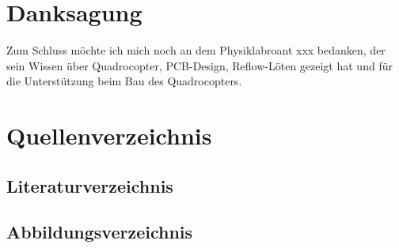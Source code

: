 \documentclass[12pt,a4paper, ngerman]{article}
\begin{document}
\section{Danksagung}
Zum Schluss möchte ich mich noch an dem Physiklabroant xxx bedanken, der sein Wissen über Quadrocopter, PCB-Design, Reflow-Löten gezeigt hat und für die Unterstützung beim Bau des Quadrocopters. 

\newpage
\section{Quellenverzeichnis}
\subsection{Literaturverzeichnis}
\printbibliography[heading=none]
\newpage
\subsection{Abbildungsverzeichnis}
\makeatletter
{}%
\makeatother
\newpage
\end{document}
